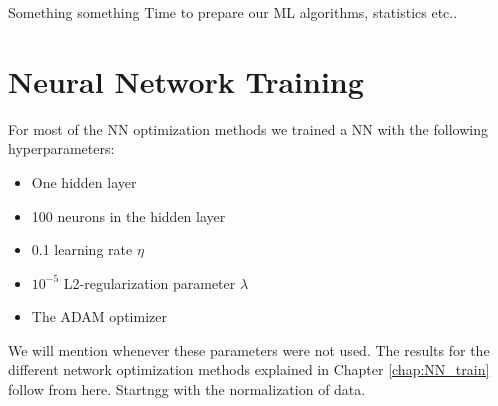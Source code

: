 \documentclass[12pt, a4paper]{book}
\begin{document}
\label{chap:Best_ML}
Something something Time to prepare our ML algorithms, statistics etc..

\section{Neural Network Training}
For most of the NN optimization methods we trained a NN with the following hyperparameters:
\begin{itemize}
   \item One hidden layer
   \item 100 neurons in the hidden layer
   \item 0.1 learning rate $\eta$
   \item $10^{-5}$ L2-regularization parameter $\lambda$
   \item The ADAM optimizer
\end{itemize}
We will mention whenever these parameters were not used. The results for the different network optimization methods explained in Chapter \ref{chap:NN_train} follow from here. Startngg with the normalization of data.\\

\clearpage
\end{document}
